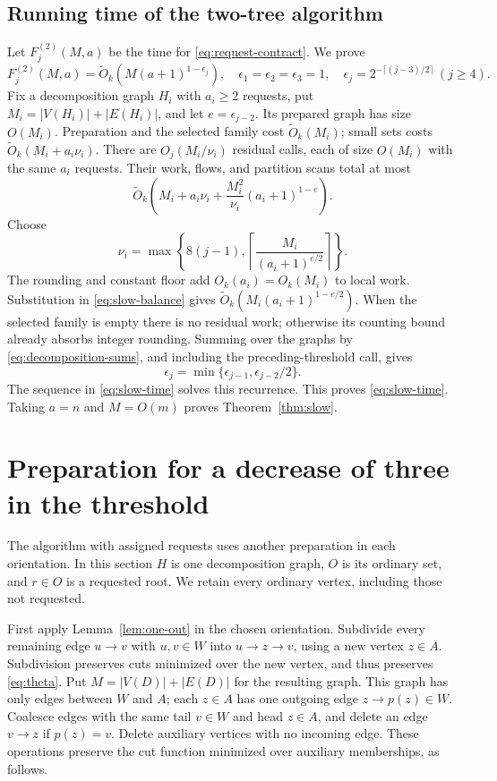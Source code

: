 \documentclass[11pt]{article}
\theoremstyle{definition}
\theoremstyle{remark}
\newcommand{\OO}{\widetilde O}
\begin{document}
\subsection{Running time of the two-tree algorithm}
\label{sec:slow-time}
Let \(F_j^{(2)}(M,a)\) be the time for \eqref{eq:request-contract}. We prove
\begin{equation}
 F_j^{(2)}(M,a)=\OO_k\!\left(M(a+1)^{1-\epsilon_j}\right),
 \quad \epsilon_1=\epsilon_2=\epsilon_3=1,
 \quad \epsilon_j=2^{-\lceil(j-3)/2\rceil}\ (j\ge4).
 \label{eq:slow-time}
\end{equation}
Fix a decomposition graph \(H_i\) with \(a_i\ge2\) requests, put \(M_i=|V(H_i)|+|E(H_i)|\), and let \(e=\epsilon_{j-2}\). Its prepared graph has size \(O(M_i)\). Preparation and the selected family cost \(\OO_k(M_i)\); small sets costs \(\OO_k(M_i+a_i\nu_i)\). There are \(O_j(M_i/\nu_i)\) residual calls, each of size \(O(M_i)\) with the same \(a_i\) requests. Their work, flows, and partition scans total at most
\begin{equation}
 \OO_k\!\left(M_i+a_i\nu_i+
              \frac{M_i^2}{\nu_i}(a_i+1)^{1-e}\right).
 \label{eq:slow-balance}
\end{equation}
Choose
\[
 \nu_i=\max\left\{8(j-1),\left\lceil
                  \frac{M_i}{(a_i+1)^{e/2}}\right\rceil\right\}.
\]
The rounding and constant floor add \(O_k(a_i)=O_k(M_i)\) to local work. Substitution in \eqref{eq:slow-balance} gives
\(\OO_k(M_i(a_i+1)^{1-e/2})\).
When the selected family is empty there is no residual work; otherwise its counting bound already absorbs integer rounding.
Summing over the graphs by \eqref{eq:decomposition-sums}, and including the preceding-threshold call, gives
\[
 \epsilon_j=\min\{\epsilon_{j-1},\epsilon_{j-2}/2\}.
\]
The sequence in \eqref{eq:slow-time} solves this recurrence. This proves \eqref{eq:slow-time}. Taking \(a=n\) and \(M=O(m)\) proves Theorem~\ref{thm:slow}.

\section{Preparation for a decrease of three in the threshold}
\label{sec:three-preparation}
The algorithm with assigned requests uses another preparation in each orientation. In this section \(H\) is one decomposition graph, \(O\) is its ordinary set, and \(r\in O\) is a requested root. We retain every ordinary vertex, including those not requested.

First apply Lemma~\ref{lem:one-out} in the chosen orientation. Subdivide every remaining edge \(u\to v\) with \(u,v\in W\) into \(u\to z\to v\), using a new vertex \(z\in A\). Subdivision preserves cuts minimized over the new vertex, and thus preserves \eqref{eq:theta}. Put \(M=|V(D)|+|E(D)|\) for the resulting graph. This graph has only edges between \(W\) and \(A\); each \(z\in A\) has one outgoing edge \(z\to p(z)\in W\). Coalesce edges with the same tail \(v\in W\) and head \(z\in A\), and delete an edge \(v\to z\) if \(p(z)=v\). Delete auxiliary vertices with no incoming edge. These operations preserve the cut function minimized over auxiliary memberships, as follows.
\end{document}
